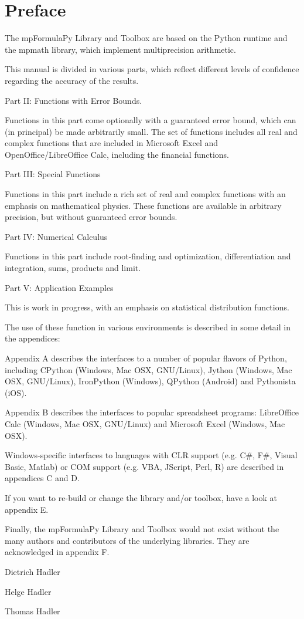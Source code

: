 \chapter{Preface}
\label{Preface} 

The mpFormulaPy Library and Toolbox are based on the Python runtime and the mpmath library, which implement multiprecision arithmetic.

\vpara
This manual is divided in various parts, which reflect different levels of confidence regarding the accuracy of the results.

\vpara
Part II: Functions with Error Bounds.

Functions in this part come optionally with a guaranteed error bound, which can (in principal) be made arbitrarily small. The set of functions includes all real and complex functions that are included in Microsoft Excel and OpenOffice/LibreOffice Calc, including the financial functions. 


\vpara
Part III: Special Functions

Functions in this part include  a rich set of real and complex functions with an emphasis on mathematical physics. These functions are available in arbitrary precision, but without guaranteed error bounds.

\vpara
Part IV: Numerical Calculus

Functions in this part include root-finding and optimization, differentiation and integration, sums, products and limit.

\vpara
Part V: Application Examples

This is work in progress, with an emphasis on statistical distribution functions.


\vpara
The use of these function in various environments is described in some detail in the appendices:

\vpara
Appendix A describes the interfaces to a number of popular flavors of Python, including CPython (Windows, Mac OSX, GNU/Linux), Jython (Windows, Mac OSX, GNU/Linux), IronPython (Windows), QPython (Android) and Pythonista (iOS).

\vpara
Appendix B describes the interfaces to popular spreadsheet programs: LibreOffice Calc (Windows, Mac OSX, GNU/Linux) and Microsoft Excel (Windows, Mac OSX).

\vpara
Windows-specific interfaces to languages with CLR support (e.g. C\#, F\#, Visual Basic, Matlab) or COM support (e.g. VBA, JScript, Perl, R) are described in appendices C and D.

\vpara
If you want to re-build or change the library and/or toolbox, have a look at appendix E.

\vpara
Finally, the mpFormulaPy Library and Toolbox would not exist without the many authors and contributors of the underlying libraries. They are acknowledged in appendix F.


\vspace{0.6cm}
Dietrich Hadler

Helge Hadler

Thomas Hadler

